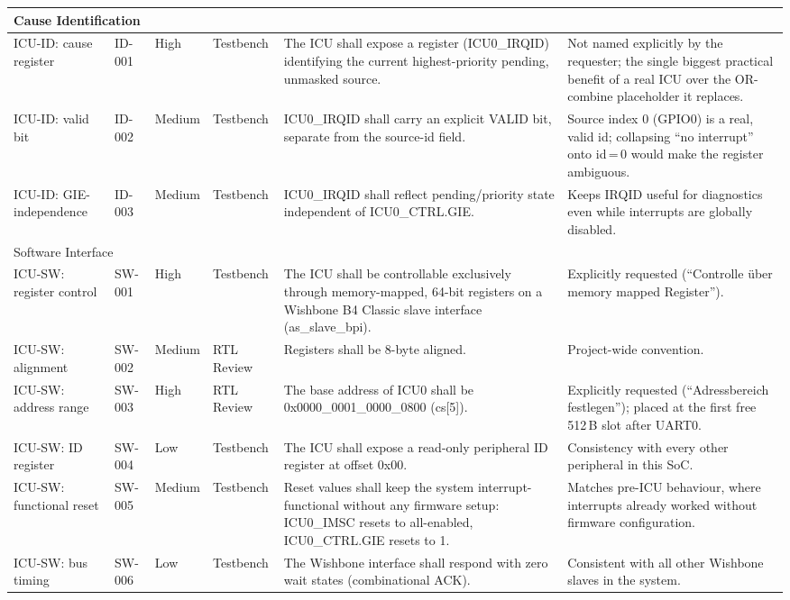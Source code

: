 \begin{longtable}{| p{} | p{} | p{} | p{} | p{} | p{} |}
\multicolumn{6}{|l|}{Cause Identification}\\
\hline
ICU-ID: cause register & ID-001 & High & Testbench &
  The ICU shall expose a register (ICU0\_IRQID) identifying the current
  highest-priority pending, unmasked source. &
  Not named explicitly by the requester; the single biggest practical
  benefit of a real ICU over the OR-combine placeholder it replaces. \\
\hline
ICU-ID: valid bit & ID-002 & Medium & Testbench &
  ICU0\_IRQID shall carry an explicit VALID bit, separate from the
  source-id field. &
  Source index 0 (GPIO0) is a real, valid id; collapsing ``no interrupt''
  onto id\,=\,0 would make the register ambiguous. \\
\hline
ICU-ID: GIE-independence & ID-003 & Medium & Testbench &
  ICU0\_IRQID shall reflect pending/priority state independent of
  ICU0\_CTRL.GIE. &
  Keeps IRQID useful for diagnostics even while interrupts are globally
  disabled. \\
\hline

\multicolumn{6}{|l|}{Software Interface}\\
\hline
ICU-SW: register control & SW-001 & High & Testbench &
  The ICU shall be controllable exclusively through memory-mapped,
  64-bit registers on a Wishbone B4 Classic slave interface
  (as\_slave\_bpi). &
  Explicitly requested (``Controlle \"uber memory mapped Register''). \\
\hline
ICU-SW: alignment & SW-002 & Medium & RTL Review &
  Registers shall be 8-byte aligned. &
  Project-wide convention. \\
\hline
ICU-SW: address range & SW-003 & High & RTL Review &
  The base address of ICU0 shall be 0x0000\_0001\_0000\_0800 (cs[5]). &
  Explicitly requested (``Adressbereich festlegen''); placed at the first
  free 512\,B slot after UART0. \\
\hline
ICU-SW: ID register & SW-004 & Low & Testbench &
  The ICU shall expose a read-only peripheral ID register at offset
  0x00. &
  Consistency with every other peripheral in this SoC. \\
\hline
ICU-SW: functional reset & SW-005 & Medium & Testbench &
  Reset values shall keep the system interrupt-functional without any
  firmware setup: ICU0\_IMSC resets to all-enabled, ICU0\_CTRL.GIE resets
  to 1. &
  Matches pre-ICU behaviour, where interrupts already worked without
  firmware configuration. \\
\hline
ICU-SW: bus timing & SW-006 & Low & Testbench &
  The Wishbone interface shall respond with zero wait states
  (combinational ACK). &
  Consistent with all other Wishbone slaves in the system. \\
\hline


\end{longtable}
